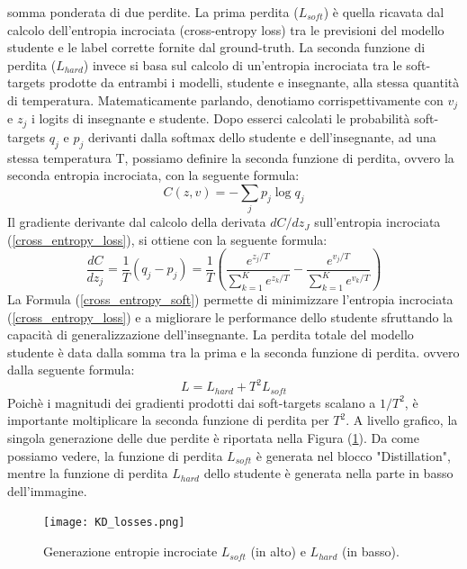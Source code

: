 somma ponderata di due perdite. La prima perdita ($L_{soft}$) è quella ricavata 
dal calcolo dell'entropia incrociata (cross-entropy loss) tra le previsioni del 
modello studente e le label corrette fornite dal ground-truth. La seconda 
funzione di perdita ($L_{hard}$) invece si basa sul calcolo di un'entropia incrociata 
tra le soft-targets prodotte da entrambi i modelli, studente e insegnante, 
alla stessa quantità di temperatura. Matematicamente parlando, denotiamo 
corrispettivamente con $v_j$ e $z_j$ i logits di insegnante e studente. Dopo esserci 
calcolati le probabilità soft-targets $q_j$ e $p_j$ derivanti dalla softmax dello 
studente e dell'insegnante, ad una stessa temperatura T, possiamo definire 
la seconda funzione di perdita, ovvero la seconda entropia incrociata, con la 
seguente formula:
\begin{equation}\label{cross_entropy_loss}
    C(z,v) = -\sum_jp_j \log{q_j}
\end{equation}
Il gradiente derivante dal calcolo della derivata $dC/dz_J$ sull'entropia incrociata 
(\ref{cross_entropy_loss}), si ottiene con la seguente formula:
\begin{equation}\label{cross_entropy_soft}
    \frac{dC}{dz_j}=\frac{1}{T}(q_j-p_j)=\frac{1}{T}\left(\frac{e^{z_j/T}}{\sum_{k=1}^K e^{z_k/T}}-\frac{e^{v_j/T}}{\sum_{k=1}^K e^{v_k/T}}\right)
\end{equation}
La Formula (\ref{cross_entropy_soft}) permette di minimizzare l'entropia incrociata (\ref{cross_entropy_loss}) 
e a migliorare le performance dello studente sfruttando la capacità di 
generalizzazione dell'insegnante. La perdita totale del modello studente è 
data dalla somma tra la prima e la seconda funzione di perdita. ovvero 
dalla seguente formula:
\begin{equation}
    L= L_{hard}+T^2L_{soft}
\end{equation}
Poichè i magnitudi dei gradienti prodotti dai soft-targets scalano a $1/T^2$, 
è importante moltiplicare la seconda funzione di perdita per $T^2$. A livello 
grafico, la singola generazione delle due perdite è riportata nella Figura 
(\ref{l_hard_soft}). Da come possiamo vedere, la funzione di perdita $L_{soft}$ è generata 
nel blocco "Distillation", mentre la funzione di perdita $L_{hard}$ dello studente 
è generata nella parte in basso dell'immagine.
\begin{figure}
    \centering
    \texttt{[image: KD\_losses.png]}
    \centering
    \caption{Generazione entropie incrociate $L_{soft}$ (in alto) e $L_{hard}$ (in basso).}
    \label{l_hard_soft}
\end{figure}